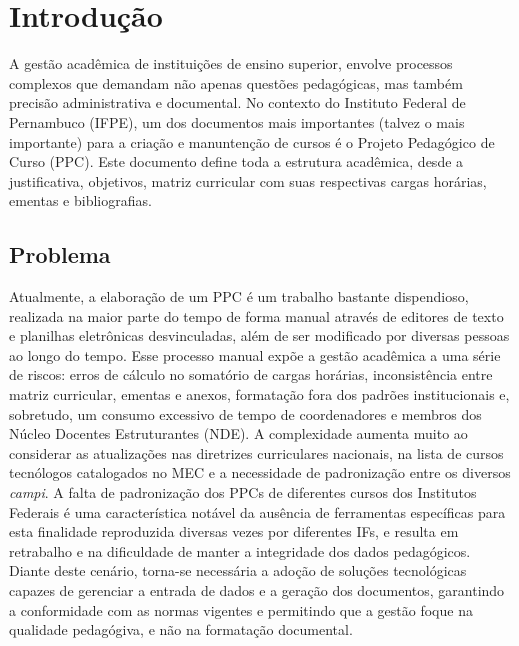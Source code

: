 \chapter{Introdução}

A gestão acadêmica de instituições de ensino superior, envolve processos complexos que demandam não apenas questões pedagógicas, mas também precisão administrativa e documental. No contexto do Instituto Federal de Pernambuco (IFPE), um dos documentos mais importantes (talvez o mais importante) para a criação e manuntenção de cursos é o Projeto Pedagógico de Curso (PPC). Este documento define toda a estrutura acadêmica, desde a justificativa, objetivos, matriz curricular com suas respectivas cargas horárias, ementas e bibliografias.

\section{Problema}
Atualmente, a elaboração de um PPC é um trabalho bastante dispendioso, realizada na maior parte do tempo de forma manual através de editores de texto e planilhas eletrônicas desvinculadas, além de ser modificado por diversas pessoas ao longo do tempo. Esse processo manual expõe a gestão acadêmica a uma série de riscos: erros de cálculo no somatório de cargas horárias, inconsistência entre matriz curricular, ementas e anexos, formatação fora dos padrões institucionais e, sobretudo, um consumo excessivo de tempo de coordenadores e membros dos Núcleo Docentes Estruturantes (NDE). A complexidade aumenta muito ao considerar as atualizações nas diretrizes curriculares nacionais, na lista de cursos tecnólogos catalogados no MEC e a necessidade de padronização entre os diversos \textit{campi}.
A falta de padronização dos PPCs de diferentes cursos dos Institutos Federais é uma característica notável da ausência de ferramentas específicas para esta finalidade reproduzida diversas vezes por diferentes IFs, e resulta em retrabalho e na dificuldade de manter a integridade dos dados pedagógicos. Diante deste cenário, torna-se necessária a adoção de soluções tecnológicas capazes de gerenciar a entrada de dados e a geração dos documentos, garantindo a conformidade com as normas vigentes e permitindo que a gestão foque na qualidade pedagógiva, e não na formatação documental.

